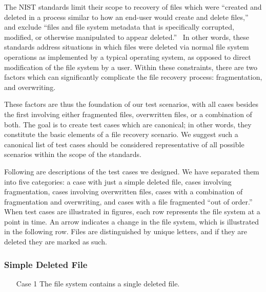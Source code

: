 The NIST standards limit their scope to recovery of files which were ``created and deleted in a process similar to how an end-user would create and delete files,''~\cite{meta:dfr:standards} and exclude ``files and file system metadata that is specifically corrupted, modified, or otherwise manipulated to appear deleted.''~\cite{meta:dfr:standards}
In other words, these standards address situations in which files were deleted via normal file system operations as implemented by a typical operating system, as opposed to direct modification of the file system by a user.
Within these constraints, there are two factors which can significantly complicate the file recovery process: 
fragmentation, and overwriting. 

These factors are thus the foundation of our test scenarios, with all cases besides the first involving either fragmented files, overwritten files, or a combination of both. 
The goal is to create test cases which are canonical; in other words, they constitute the basic elements of a file recovery scenario.
We suggest such a canonical list of test cases should be considered representative of all possible scenarios within the scope of the standards.

Following are descriptions of the test cases we designed. 
We have separated them into five categories: 
a case with just a simple deleted file, 
cases involving fragmentation,
cases involving overwritten files,
cases with a combination of fragmentation and overwriting,
and cases with a file fragmented ``out of order.''
When test cases are illustrated in figures, each row represents the file system at a point in time. An arrow indicates a change in the file system, which is illustrated in the following row. Files are distinguished by unique letters, and if they are deleted they are marked as such.
\subsubsection{Simple Deleted File}
\begin{itemize}[align=parleft, labelwidth=4em, leftmargin =\dimexpr{}+\relax]
    \item [Case 1] The file system contains a single deleted file.
\end{itemize}
